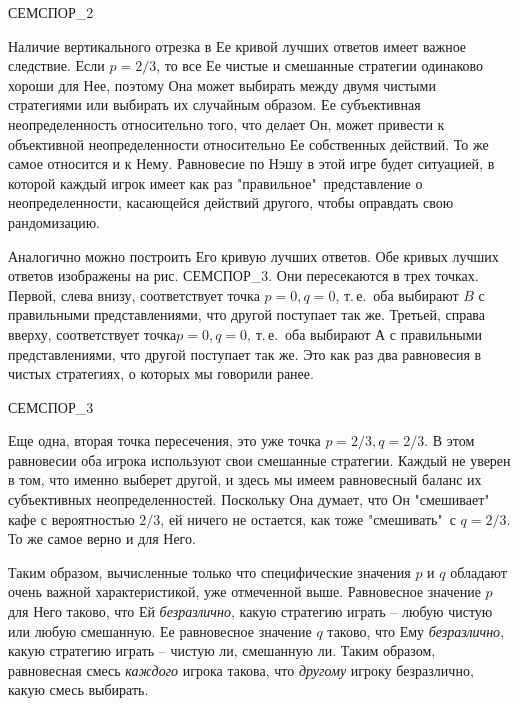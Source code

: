 {СЕМСПОР_2

Наличие вертикального отрезка  в Ее кривой лучших ответов имеет важное следствие. Если
$p=2/3$, то все Ее чистые и смешанные стратегии одинаково хороши для Нее, поэтому Она
может выбирать между двумя чистыми стратегиями или выбирать их случайным образом.
Ее субъективная неопределенность относительно того, что делает Он, может привести к
объективной неопределенности относительно Ее собственных действий. То же самое относится и к Нему.
Равновесие по Нэшу в этой игре будет ситуацией, в которой каждый игрок имеет как раз
"правильное"\, представление о неопределенности, касающейся действий другого, чтобы
оправдать свою рандомизацию.

Аналогично можно построить Его кривую лучших ответов. Обе кривых лучших ответов изображены
на рис. СЕМСПОР_3. Они пересекаются в трех точках. Первой, слева внизу, соответствует точка
$p=0, q=0$, т.\,е.\, оба выбирают $B$ с правильными представлениями, что другой поступает так же.
Третьей, справа вверху, соответствует точка$p=0, q=0$, т.\,е.\, оба выбирают $А$ с
правильными представлениями, что другой поступает так же. Это как раз два равновесия в
чистых стратегиях, о которых мы говорили ранее.

СЕМСПОР_3

Еще одна, вторая точка пересечения, это уже точка $p=2/3, q=2/3$. В этом равновесии оба игрока
используют свои смешанные стратегии. Каждый не уверен в том, что именно выберет другой, и здесь
мы имеем равновесный баланс их субъективных неопределенностей. Поскольку Она думает, что Он
"смешивает"\, кафе с вероятностью $2/3$, ей ничего не остается, как тоже "смешивать"\, с
$q=2/3$. То же самое верно и для Него.


Таким образом, вычисленные только что специфические значения $p$ и $q$
обладают очень важной характеристикой, уже отмеченной выше.
Равновесное значение $p$ для Него таково,
что Ей \emph{безразлично}, какую стратегию играть -- любую чистую или любую
смешанную. Ее равновесное значение $q$ таково, что Ему \emph{безразлично},
какую стратегию играть -- чистую ли, смешанную ли. Таким образом,
равновесная смесь \emph{каждого} игрока такова, что \emph{другому}
игроку безразлично, какую смесь выбирать.

}
